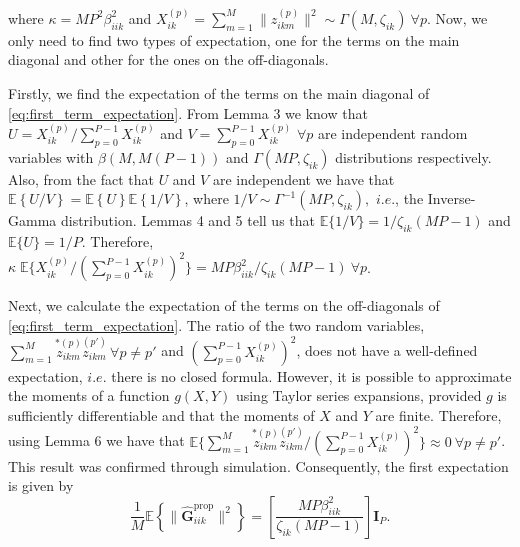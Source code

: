 \documentclass[journal,12pt,onecolumn]{IEEEtran}
\begin{document}
where $\kappa = M P^{2} \beta_{iik}^{2}$ and $X_{ik}^{(p)} = \sum_{m=1}^{M} \lVert z_{ikm}^{(p)} \rVert^{2} \sim \Gamma(M,\zeta_{ik}) \ \forall p$. Now, we only need to find two types of expectation, one for the terms on the main diagonal and other for the ones on the off-diagonals. 

Firstly, we find the expectation of the terms on the main diagonal of \eqref{eq:first_term_expectation}. From Lemma 3 we know that $U = X_{ik}^{(p)} / \sum_{p=0}^{P-1}{X_{ik}^{(p)}}$ and $V = \sum_{p=0}^{P-1} X_{ik}^{(p)}$ $\forall p$ are independent random variables with $\beta(M,M(P-1))$ and $\Gamma(MP,\zeta_{ik})$ distributions respectively. Also, from the fact that $U$ and $V$ are independent we have that $\mathbb{E} \left\lbrace U/V  \right\rbrace = \mathbb{E} \left\lbrace U  \right\rbrace \mathbb{E} \left\lbrace 1/V  \right\rbrace$, where $1/V \sim \Gamma^{-1}(MP, \zeta_{ik}), $ $i.e.$, the Inverse-Gamma distribution. Lemmas 4 and 5 tell us that $\mathbb{E} \{ 1/V \} = 1 / \zeta_{ik}(MP-1)$ and $\mathbb{E} \{ U \} = 1/P$. Therefore, $\kappa \; \mathbb{E} \{ X_{ik}^{(p)} / ( \sum_{p=0}^{P-1} X_{ik}^{(p)} )^{2} \}  = MP \beta_{iik}^{2} / \zeta_{ik}(MP-1) \ \forall p$. 

Next, we calculate the expectation of the terms on the off-diagonals of \eqref{eq:first_term_expectation}. The ratio of the two random variables, $\sum_{m=1}^{M}{ \overset{*(p)}{{z}_{ikm}} \overset{(p')}{{z}_{ikm}} } \ \forall p \neq p'$ and $( \sum_{p=0}^{P-1} X_{ik}^{(p)} )^{2}$,  does not have a well-defined expectation, $i.e.$ there is no closed formula. However, it is possible to approximate the moments of a function $g(X,Y)$ using Taylor series expansions, provided $g$ is sufficiently differentiable and that the moments of $X$ and $Y$ are finite. Therefore, using Lemma 6 we have that $\mathbb{E} \{ \sum_{m=1}^{M}{ \overset{*(p)}{{z}_{ikm}} \overset{(p')}{{z}_{ikm}} } / (\sum_{p=0}^{P-1}{X_{ik}^{(p)}})^{2} \} \approx 0 \ \forall p \neq p'$. This result was confirmed through simulation. Consequently, the first expectation is given by
\begin{equation}\label{eq:first_term_expectation2}
\frac{1}{M} \mathbb{E} \left\lbrace \lVert \hat{\textbf{G}}_{iik}^{\text{prop}} \rVert^{2} \right\rbrace = \left[ \frac{MP \beta_{iik}^{2}}{\zeta_{ik}(MP-1)} \right] \textbf{I}_{P}.
\end{equation}
\end{document}
